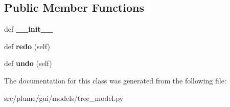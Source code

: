 \subsection*{Public Member Functions}
\begin{DoxyCompactItemize}
\item 
def {\bfseries \+\_\+\+\_\+init\+\_\+\+\_\+}\hypertarget{classplume-creator_1_1src_1_1plume_1_1gui_1_1models_1_1tree__model_1_1_change_title_command_ab2a33b292678ce73a1ba40b82d1b4602}{}\label{classplume-creator_1_1src_1_1plume_1_1gui_1_1models_1_1tree__model_1_1_change_title_command_ab2a33b292678ce73a1ba40b82d1b4602}

\item 
def {\bfseries redo} (self)\hypertarget{classplume-creator_1_1src_1_1plume_1_1gui_1_1models_1_1tree__model_1_1_change_title_command_ad1dcae3af686718b4ecb201ce521a3bc}{}\label{classplume-creator_1_1src_1_1plume_1_1gui_1_1models_1_1tree__model_1_1_change_title_command_ad1dcae3af686718b4ecb201ce521a3bc}

\item 
def {\bfseries undo} (self)\hypertarget{classplume-creator_1_1src_1_1plume_1_1gui_1_1models_1_1tree__model_1_1_change_title_command_a874f4a0c7977f221f962e24853e64cb7}{}\label{classplume-creator_1_1src_1_1plume_1_1gui_1_1models_1_1tree__model_1_1_change_title_command_a874f4a0c7977f221f962e24853e64cb7}

\end{DoxyCompactItemize}


The documentation for this class was generated from the following file\+:\begin{DoxyCompactItemize}
\item 
src/plume/gui/models/tree\+\_\+model.\+py\end{DoxyCompactItemize}
